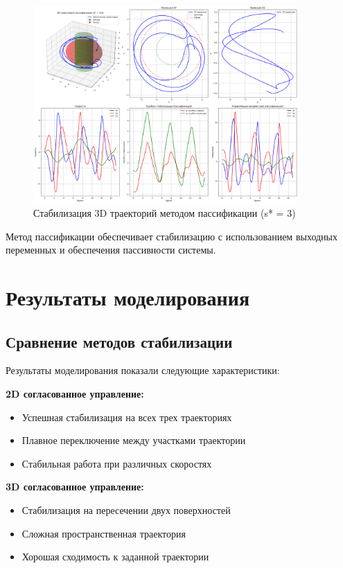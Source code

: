 \begin{figure}[H]
\centering
\includegraphics[width=0.9\textwidth]{images/task3/passification_3d_s3.0.png}
\caption{Стабилизация 3D траекторий методом пассификации (s* = 3)}
\label{fig:passification_3d}
\end{figure}

Метод пассификации обеспечивает стабилизацию с использованием выходных переменных и обеспечения пассивности системы.

\section{Результаты моделирования}

\subsection{Сравнение методов стабилизации}

Результаты моделирования показали следующие характеристики:

\textbf{2D согласованное управление:}
\begin{itemize}
\item Успешная стабилизация на всех трех траекториях
\item Плавное переключение между участками траектории
\item Стабильная работа при различных скоростях
\end{itemize}

\textbf{3D согласованное управление:}
\begin{itemize}
\item Стабилизация на пересечении двух поверхностей
\item Сложная пространственная траектория
\item Хорошая сходимость к заданной траектории
\end{itemize}

